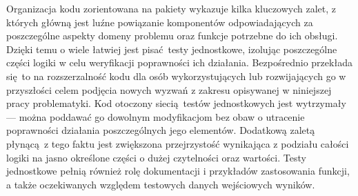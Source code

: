 \par{
  Organizacja kodu zorientowana na pakiety wykazuje kilka kluczowych zalet, z których główną jest luźne powiązanie komponentów odpowiadających za poszczególne aspekty domeny problemu oraz funkcje potrzebne do ich obsługi.
  Dzięki temu o wiele łatwiej jest pisać testy jednostkowe, izolując poszczególne części logiki w celu weryfikacji poprawności ich działania. 
  Bezpośrednio przekłada się to na rozszerzalność kodu dla osób wykorzystujących lub rozwijających go w przyszłości celem podjęcia nowych wyzwań z zakresu opisywanej w niniejszej pracy problematyki.
  Kod otoczony siecią testów jednostkowych jest wytrzymały --- można poddawać go dowolnym modyfikacjom bez obaw o utracenie poprawności działania poszczególnych jego elementów.
  Dodatkową zaletą płynącą z tego faktu jest zwiększona przejrzystość wynikająca z podziału całości logiki na jasno określone części o dużej czytelności oraz wartości.
  Testy jednostkowe pełnią również rolę dokumentacji i przykładów zastosowania funkcji, a także oczekiwanych względem testowych danych wejściowych wyników.
}